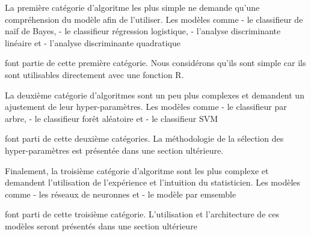 La première catégorie d'algoritme les plus simple ne demande qu'une compréhension du modèle afin de l'utiliser. Les modèles comme 
- le classifieur de naïf de Bayes, 
- le classifieur régression logistique, 
- l'analyse discriminante linéaire et 
- l'analyse discriminante quadratique 

font partie de cette première catégorie. Nous considérons qu'ils sont simple car ils sont utilisables directement avec une fonction R. 

La deuxième catégorie d'algoritmes sont un peu plus complexes et demandent un ajustement de leur hyper-paramètres. Les modèles comme 
- le classifieur par arbre, 
- le classifieur forêt aléatoire et 
- le classifieur SVM 

font parti de cette deuxième catégories. La méthodologie de la sélection des hyper-paramètres est présentée dans une section ultérieure.

Finalement, la troisième catégorie d'algoritme sont les plus complexe et demandent l'utilisation de l'expérience et l'intuition du statisticien. Les modèles comme 
- les réseaux de neuronnes et 
- le modèle par emsemble 

font parti de cette troisième catégorie. L'utilisation et l'architecture de ces modèles seront présentés dans une section ultérieure

\subsection{}


\subsection{}

